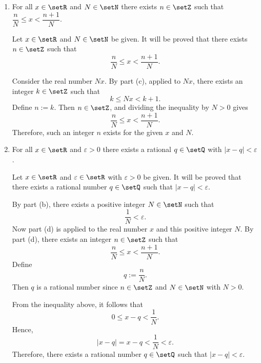 \begin{enumerate}
\begin{enumerate}[label=(\alph*)]
\begin{subprove}
        Set \(n := a\).
        Then \(n \in \setZ\) and \(n \le x\) holds because \(n \in A\) by definition.
        It remains to show that \(x < n + 1\).
        Since \(n\) is the greatest integer less than or equal to \(x\), the integer \(n + 1\) cannot belong to \(A\).
        Thus \(n + 1 \nleq x\), i.e., \(n + 1 > x\).
        Therefore,
        \[
          n \le x < n + 1.
        \]
        Hence, such an integer \(n\) exists for the given real number \(x\).
      \end{subprove}
      \item For all \(x\in\setR\) and \(N\in\setN\) there exists \(n\in\setZ\) such that \(\dfrac{n}{N}\le x<\dfrac{n+1}{N}\).
      \begin{subprove}
        Let \(x \in \setR\) and \(N \in \setN\) be given.
        It will be proved that there exists \(n \in \setZ\) such that
        \[
          \frac{n}{N} \le x < \frac{n+1}{N}.
        \]
        
        Consider the real number \(Nx\).
        By part (c), applied to \(Nx\), there exists an integer \(k \in \setZ\) such that
        \[
          k \le Nx < k + 1.
        \]
        Define \(n := k\).
        Then \(n \in \setZ\), and dividing the inequality by \(N > 0\) gives
        \[
          \frac{n}{N} \le x < \frac{n+1}{N}.
        \]
        Therefore, such an integer \(n\) exists for the given \(x\) and \(N\).
      \end{subprove}
      \item For all \(x\in\setR\) and \(\varepsilon>0\) there exists a rational \(q\in\setQ\) with \(|x-q|<\varepsilon\).
      \begin{subprove}
        Let \(x \in \setR\) and \(\varepsilon \in \setR\) with \(\varepsilon > 0\) be given.
        It will be proved that there exists a rational number \(q \in \setQ\) such that \(|x - q| < \varepsilon\).
        
        By part (b), there exists a positive integer \(N \in \setN\) such that
        \[
          \frac{1}{N} < \varepsilon.
        \]
        Now part (d) is applied to the real number \(x\) and this positive integer \(N\).
        By part (d), there exists an integer \(n \in \setZ\) such that
        \[
          \frac{n}{N} \le x < \frac{n+1}{N}.
        \]
        Define
        \[
          q := \frac{n}{N}.
        \]
        Then \(q\) is a rational number since \(n \in \setZ\) and \(N \in \setN\) with \(N > 0\).
        
        From the inequality above, it follows that
        \[
          0 \le x - q < \frac{1}{N}.
        \]
        Hence,
        \[
          |x - q| = x - q < \frac{1}{N} < \varepsilon.
        \]
        Therefore, there exists a rational number \(q \in \setQ\) such that \(|x - q| < \varepsilon\).
      \end{subprove}
    \end{enumerate}


\end{enumerate}
